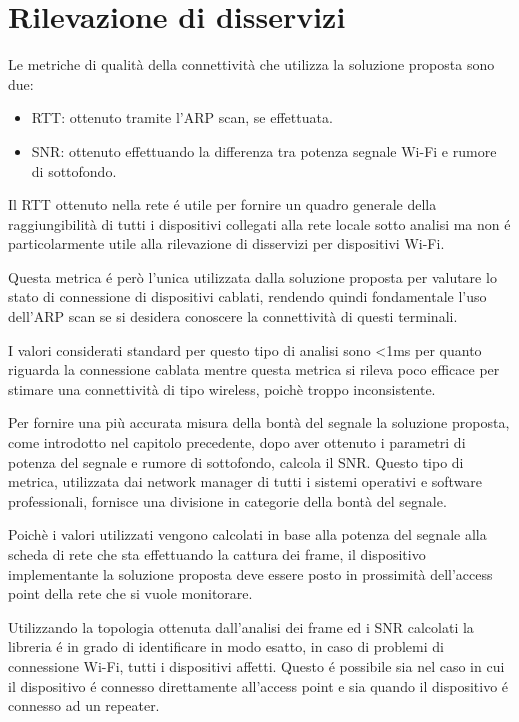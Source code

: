 \newpage 

\section{Rilevazione di disservizi}

Le metriche di qualit\`a della connettivit\`a  che utilizza la soluzione proposta sono due:
\begin{itemize}
	\item RTT: ottenuto tramite l'ARP scan, se effettuata.
	\item SNR: ottenuto effettuando la differenza tra potenza segnale Wi-Fi e rumore di sottofondo.
\end{itemize}

Il RTT ottenuto nella rete \'e utile per fornire un quadro generale della raggiungibilit\`a di tutti i dispositivi collegati alla rete locale sotto analisi ma non \'e particolarmente utile alla rilevazione di disservizi per dispositivi Wi-Fi.

Questa metrica \'e per\`o l'unica utilizzata dalla soluzione proposta per valutare lo stato di connessione di dispositivi cablati, rendendo quindi fondamentale l'uso dell'ARP scan se si desidera conoscere la connettivit\`a di questi terminali.

I valori considerati standard per questo tipo di analisi sono <1ms per quanto riguarda la connessione cablata mentre questa metrica si rileva poco efficace per stimare una connettivit\`a di tipo wireless, poich\`e troppo inconsistente.

Per fornire una pi\`u accurata misura della bont\`a del segnale la soluzione proposta, come introdotto nel capitolo precedente, dopo aver ottenuto i parametri di potenza del segnale e rumore di sottofondo, calcola il SNR.
Questo tipo di metrica, utilizzata dai network manager di tutti i sistemi operativi e software professionali, fornisce una divisione in categorie della bont\`a del segnale.

Poich\`e i valori utilizzati vengono calcolati in base alla potenza del segnale alla scheda di rete che sta effettuando la cattura dei frame, il dispositivo implementante la soluzione proposta deve essere posto in prossimit\`a dell'access point della rete che si vuole monitorare.

Utilizzando la topologia ottenuta dall'analisi dei frame ed i SNR calcolati la libreria \'e in grado di identificare in modo esatto, in caso di problemi di connessione Wi-Fi, tutti i dispositivi affetti.
Questo \'e possibile sia nel caso in cui il dispositivo \'e connesso direttamente all'access point e sia quando il dispositivo \'e connesso ad un repeater.

